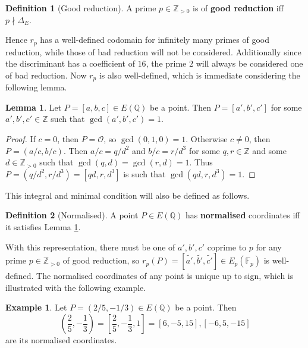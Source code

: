 \documentclass{article}
\newcommand{\F}{\mathbb{F}}
\newcommand{\Z}{\mathbb{Z}}
\newcommand{\Q}{\mathbb{Q}}
\newcommand{\rb}[1]{\left( #1 \right)}
\renewcommand{\sb}[1]{\left[ #1 \right]}
\theoremstyle{definition}
\newtheorem*{definition}{Definition}
\newtheorem*{example}{Example}
\newtheorem{lemma}[proposition]{Lemma}
\begin{document}
\begin{definition}[Good reduction]
A prime $ p \in \Z_{> 0} $ is of \textbf{good reduction} iff $ p \nmid \Delta_E $.
\end{definition}

Hence $ r_p $ has a well-defined codomain for infinitely many primes of good reduction, while those of bad reduction will not be considered. Additionally since the discriminant has a coefficient of $ 16 $, the prime $ 2 $ will always be considered one of bad reduction. Now $ r_p $ is also well-defined, which is immediate considering the following lemma.

\begin{lemma}
\label{lem:normalise}
Let $ P = \sb{a, b, c} \in E\rb{\Q} $ be a point. Then $ P = \sb{a', b', c'} $ for some $ a', b', c' \in \Z $ such that $ \gcd\rb{a', b', c'} = 1 $.
\end{lemma}

\begin{proof}
If $ c = 0 $, then $ P = \mathcal{O} $, so $ \gcd\rb{0, 1, 0} = 1 $. Otherwise $ c \ne 0 $, then $ P = \rb{a / c, b / c} $. Then $ a / c = q / d^2 $ and $ b / c = r / d^3 $ for some $ q, r \in \Z $ and some $ d \in \Z_{> 0} $ such that $ \gcd\rb{q, d} = \gcd\rb{r, d} = 1 $. Thus $ P = \rb{q / d^2, r / d^3} = \sb{qd, r, d^3} $ is such that $ \gcd\rb{qd, r, d^3} = 1 $.
\end{proof}

This integral and minimal condition will also be defined as follows.

\begin{definition}[Normalised]
A point $ P \in E\rb{\Q} $ has \textbf{normalised} coordinates iff it satisfies Lemma \ref{lem:normalise}.
\end{definition}

With this representation, there must be one of $ a', b', c' $ coprime to $ p $ for any prime $ p \in \Z_{> 0} $ of good reduction, so $ r_p\rb{P} = \sb{\tilde{a'}, \tilde{b'}, \tilde{c'}} \in E_p\rb{\F_p} $ is well-defined. The normalised coordinates of any point is unique up to sign, which is illustrated with the following example.

\begin{example}
Let $ P = \rb{2 / 5, -1 / 3} \in E\rb{\Q} $ be a point. Then
$$ \rb{\dfrac{2}{5}, -\dfrac{1}{3}} = \sb{\dfrac{2}{5}, -\dfrac{1}{3}, 1} = \sb{6, -5, 15}, \sb{-6, 5, -15} $$
are its normalised coordinates.
\end{example}
\end{document}
